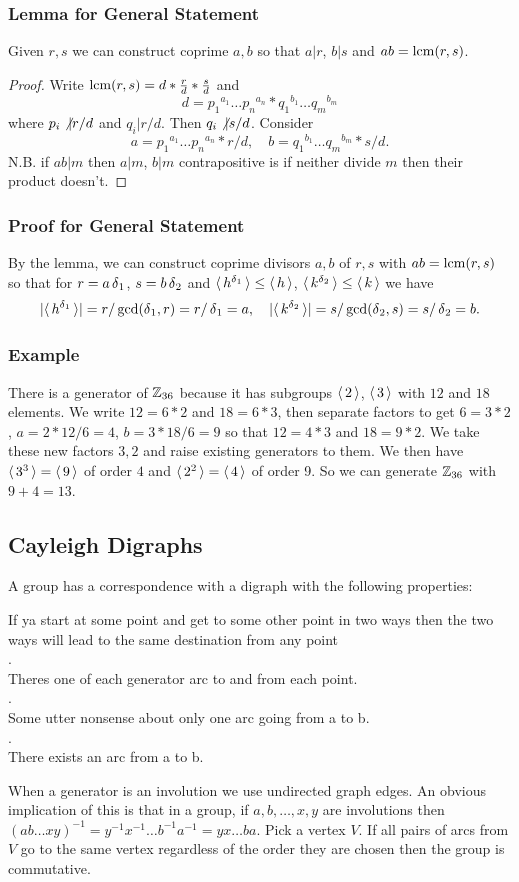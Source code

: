 \subsubsection*{Lemma for General Statement}
Given $r,s$ we can construct coprime $a,b$ so that $a \vert r$, $b \vert s$ and
$ab = \operatorname{lcm}(r,s)$.
\begin{proof}
Write $\operatorname{lcm}(r,s) = d*\frac{r}{d}*\frac{s}{d}$ and $$
d = {p_1}^{a_1} \hdots {p_n}^{a_n} * {q_1}^{b_1} \hdots {q_m}^{b_m}
$$
where $p_i \not \vert r \slash d$ and $q_i \vert r \slash d$.
Then $q_i \not \vert s \slash d$. Consider $$
a = {p_1}^{a_1} \hdots {p_n}^{a_n} * r \slash d,
\quad b = {q_1}^{b_1} \hdots {q_m}^{b_m} * s \slash d.$$
N.B.
if $ab \vert m$ then $a \vert m$,
$b \vert m$ contrapositive is if neither divide $m$ then their product doesn't.
\end{proof}
\subsubsection*{Proof for General Statement}
By the lemma, we can construct coprime divisors $a,b$ of $r,s$
with $ab = \operatorname{lcm}(r,s)$ so that for $r = a\operatorname{\delta}_1$, $s = b \operatorname{\delta}_2$
and $\operatorname{\langle} h^{\operatorname{\delta}_1} \operatorname{\rangle} \leq \operatorname{\langle} h \operatorname{\rangle}$, $\langle \, k^{\operatorname{\delta}_2} \, \rangle \leq \langle \, k \, \rangle$
we have $$|\langle \, h^{\operatorname{\delta}_1} \, \rangle| = r \slash \gcd(\operatorname{\delta}_1,r) = r \slash \operatorname{\delta}_1 = a, \quad
|\langle \, k^{\operatorname{\delta}_2} \, \rangle| = s \slash \gcd(\operatorname{\delta}_2,s) = s \slash \operatorname{\delta}_2 = b.$$
\subsubsection*{Example}
There is a generator of $\operatorname{\mathbb{Z}}_{36}$ because it has
subgroups $\langle \, 2 \, \rangle$,
$\langle \, 3 \, \rangle$ with $12$ and $18$ elements. We write $12 = 6 * 2$ and $18 = 6 * 3$, then separate factors to get $6 = 3 * 2$,
$a = 2 * 12 \slash 6 = 4$, $b = 3 * 18 \slash 6 = 9$ so that $12 = 4 * 3$ and $18 = 9 * 2$.  We take these new factors $3,2$ and raise existing generators to them.
We then have $\langle \, 3^3 \, \rangle = \langle \, 9 \, \rangle$ of order $4$ and $\langle \, 2^2 \, \rangle = \langle \, 4 \, \rangle$ of order 9.
So we can generate $\operatorname{\mathbb{Z}}_{36}$ with $9+4 = 13$.
\subsection*{Cayleigh Digraphs}
A group has a correspondence with a digraph with the following properties:
\begin{center}
If ya start at some point and get to some other point in two ways then the two ways will lead to the same destination from any point \\
.\\
Theres one of each generator arc to and from each point. \\
. \\
Some utter nonsense about only one arc going from a to b. \\
. \\
There exists an arc from a to b.
\end{center}
When a generator is an involution we use undirected graph edges.
An obvious implication of this is that in a group, if $a,b,\hdots,x,y$ are involutions then
$(ab \hdots xy)^{-1} = y^{-1}x^{-1} \hdots b^{-1}a^{-1} = yx \hdots ba$.
Pick a vertex $V$. If all pairs of arcs from $V$ go to the same vertex regardless of the order they are chosen then the group is commutative.
